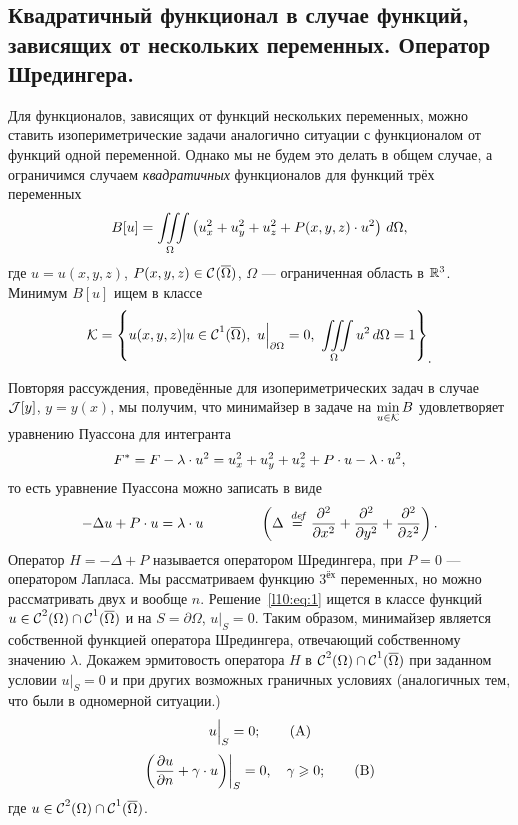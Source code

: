 	\chapter{}
\label{lecture10}
\section[Квадратичный функционал. Оператор Шредингера.]{Квадратичный функционал в случае функций, зависящих от нескольких переменных. Оператор Шредингера.}
\label{lecture10section1}
Для функционалов, зависящих от функций нескольких переменных, можно ставить изопериметрические задачи аналогично ситуации с функционалом от функций одной переменной. Однако мы не будем это делать в общем случае, а ограничимся случаем \emph{квадратичных} функционалов для функций трёх переменных
\begin{equation}\label{l10:eq:0}
	\hfill B[u]=\iiint\limits_{\Omega}\left(u_x^2+u_y^2+u_z^2+P(x,y,z)\cdot u^2\right)\,d\Omega,\hfill
\end{equation}
где $u=u(x,y,z)$, $P(x,y,z)\in\mathcal{C}{\mathstrut}^{}_{}(\overline{\Omega})$, $\Omega$ --- ограниченная область в $\mathbb{R}^3$. Минимум $B[u]$ ищем в классе
\begin{equation*}
	\hfill\K=\left\{u(x,y,z)|u\in\Cfn{1}(\overline{\Omega}),\ u\Big|_{\partial\Omega}=0,\ \iiint\limits_{\Omega}u^2\,d\Omega=1\right\}_{\displaystyle.}\hfill
\end{equation*}

Повторяя рассуждения, проведённые для изопериметрических задач в случае $\mathcal{J}[y]$, $y=y(x)$, мы получим, что минимайзер в задаче на $\displaystyle\min\limits_{u\in\mathcal{K}}B$ удовлетворяет уравнению Пуассона для интегранта
\begin{equation*}
	\hfill F^{\ast}=F-\lambda\cdot u^2=u_x^2+u_y^2+u_z^2+P\cdot u-\lambda\cdot u^2,\hfill
\end{equation*}
то есть уравнение Пуассона можно записать в виде
\begin{equation}\label{l10:eq:1}
	\hfill-\Delta u+P\cdot u=\lambda\cdot u\qquad\qquad\left(\Delta\eqdef\pdder{}{x}+\pdder{}{y}+\pdder{}{z}\right).\hfill
\end{equation}
Оператор $H=-\Delta+P$ называется оператором Шредингера, при $P=0$ --- оператором Лапласа. Мы рассматриваем функцию $3^{\text{ёх}}$ переменных, но можно рассматривать двух и вообще $n$. Решение~\eqref{l10:eq:1} ищется в классе функций $u\in\mathcal{C}{\mathstrut}^{2}_{}(\Omega)\cap\mathcal{C}{\mathstrut}^{1}_{}(\overline{\Omega})$ и на $S=\partial\Omega$, $u\Big|_{S}=0$. Таким образом, минимайзер является собственной функцией оператора Шредингера, отвечающий собственному значению $\lambda$. Докажем эрмитовость оператора $H$ в $\mathcal{C}{\mathstrut}^{2}_{}(\Omega)\cap\mathcal{C}{\mathstrut}^{1}_{}(\overline{\Omega})$ при заданном условии $u\Big|_{S}=0$ и при других возможных граничных условиях (аналогичных тем, что были в одномерной ситуации.)
\begin{equation}\label{l10:eq:A}
	\hfill u\Big|_{S}=0;\tag{A}\hfill
\end{equation}
\begin{equation}\label{l10:eq:B}
	\hfill \left(\pder{u}{n}+\gamma\cdot u\middle)\right|_{S}=0,\quad\gamma\geqslant0;\tag{B}\hfill
\end{equation}
где $u\in\mathcal{C}{\mathstrut}^{2}_{}(\Omega)\cap\mathcal{C}{\mathstrut}^{1}_{}(\overline{\Omega})$.

